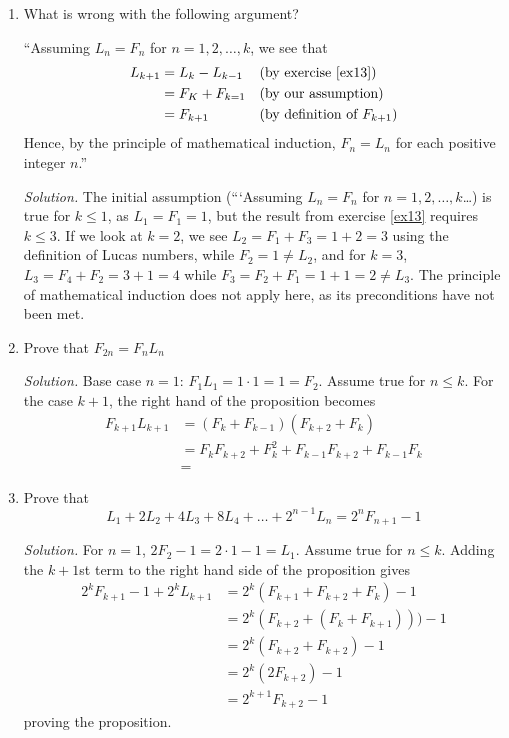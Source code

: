 \documentclass[12pt]{article}
\newcommand\sol[1]{\begin{mdframed}
\emph{Solution.} #1
\end{mdframed}}
\begin{document}
\begin{enumerate}
  \item What is wrong with the following argument?

    ``Assuming $L_n = F_n$ for $n=1,2,\ldots,k$, we see that
    \begin{align*}
      L_{k+1} &= L_k - L_{k-1} && \text{(by exercise \ref{ex13})} \\
      &= F_K + F_{k=1} && \text{(by our assumption)} \\
      &= F_{k+1} && \text{(by definition of $F_{k+1}$)}
    \end{align*}
    Hence, by the principle of mathematical induction, $F_n = L_n$ for
    each positive integer $n$.''  \sol{ The initial assumption
      (```Assuming $L_n = F_n$ for $n=1,2,\ldots,k$\ldots) is true for
      $k \le 1$, as $L_1 = F_1 = 1$, but the result from exercise
      \ref{ex13} requires $k \le 3$. If we look at $k=2$, we see $L_2
      = F_1 + F_3 = 1+2 = 3$ using the definition of Lucas numbers,
      while $F_2=1 \ne L_2$, and for $k=3$, $L_3 = F_4 + F_2 = 3 + 1 =
      4$ while $F_3 = F_2 + F_1 = 1+1 =2 \ne L_3$. The principle of
      mathematical induction does not apply here, as its preconditions
      have not been met.  }
    
  \item Prove that $F_{2n} = F_nL_n$
    \sol{      
    Base case $n=1$: $F_1L_1 = 1\cdot1 = 1 = F_2$. Assume true for $n
    \le k$. For the case $k+1$, the right hand of the proposition
    becomes
    \begin{align*}
      F_{k+1}L_{k+1} &= (F_k + F_{k-1})(F_{k+2} + F_k) \\
      &= F_kF_{k+2} + F_k^2 + F_{k-1}F_{k+2} + F_{k-1}F_k \\
      &=
    \end{align*}
    }
    
  \item Prove that
    \[
    L_1 + 2L_2 + 4L_3 + 8L_4 + \ldots + 2^{n-1}L_n = 2^nF_{n+1}-1
    \]
    \sol{
      For $n=1$, $2F_2 - 1 = 2\cdot1 - 1 = L_1$. Assume true for $n \le k$. Adding the $k+1$st term to the right hand side of the proposition gives
      \begin{align*}
        2^kF_{k+1} - 1 + 2^kL_{k+1} &= 2^k(F_{k+1} + F_{k+2} + F_{k}) -1 \\
        &= 2^k(F_{k+2} +(F_k + F_{k+1}))) - 1 \\
        &= 2^k(F_{k+2} +F_{k+2}) - 1 \\
        &= 2^k(2F_{k+2}) - 1 \\
        &= 2^{k+1}F_{k+2} - 1
      \end{align*}
      proving the proposition.
      }
    

\end{enumerate}
\end{document}
